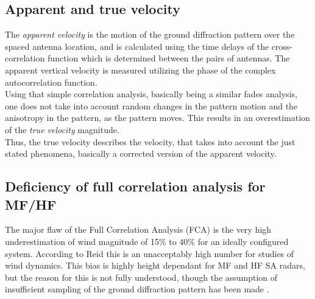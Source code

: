 \subsection{Apparent and true velocity}
The \textit{apparent velocity} is the motion of the ground diffraction pattern over the spaced antenna location, and is calculated using the time delays of the cross-correlation function which is determined between the pairs of antennas. The apparent vertical velocity is measured utilizing the phase of the complex autocorrelation function. \\
Using that simple correlation analysis, basically being a similar fades analysis, one does not take into account random changes in the pattern motion and the anisotropy in the pattern, as the pattern moves. This results in an overestimation of the \textit{true velocity} magnitude. \\
Thus, the true velocity describes the velocity, that takes into account the just stated phenomena, basically a corrected version of the apparent velocity.



\subsection{Deficiency of full correlation analysis for MF/HF}

The major flaw of the Full Correlation Analysis (FCA) is the very high underestimation of wind magnitude of 15\% to 40\% for an ideally configured system. According to Reid \citep{reid2015mf} this is an unacceptably high number for studies of wind dynamics. This bias is highly height dependant for MF and HF SA radars, but the reason for this is not fully understood, though the assumption of insufficient sampling of the ground diffraction pattern has been made \citep{reid2015mf}.






